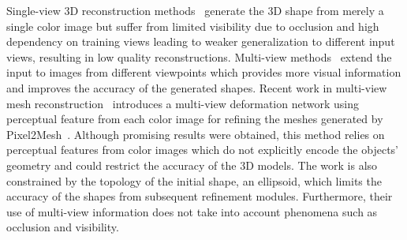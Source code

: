Single-view 3D reconstruction methods~\cite{wang2018pixel2mesh,huang2015single,kar2015category,su2014estimating} generate the 3D shape from merely a single color image but suffer from limited visibility due to occlusion and high dependency on training views leading to weaker generalization to different input views, resulting in low quality reconstructions.
Multi-view methods~\cite{wen2019pixel2mesh++,3dr2n2,kar2017lsm,mcrecon2017} extend the input to images from different viewpoints which provides more visual information and improves the accuracy of the generated shapes.
Recent work in multi-view mesh reconstruction~\cite{wen2019pixel2mesh++} introduces a multi-view deformation network using perceptual feature from each color image for refining the meshes generated by Pixel2Mesh~\cite{wang2018pixel2mesh}.
Although promising results were obtained, this method relies on perceptual features from color images which do not explicitly encode the objects' geometry and could restrict the accuracy of the 3D models.
The work is also constrained by the topology of the initial shape, an ellipsoid, which limits the accuracy of the shapes from subsequent refinement modules.
Furthermore, their use of multi-view information does not take into account phenomena such as occlusion and visibility.


